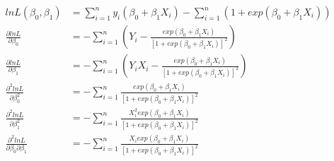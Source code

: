 \documentclass{article}\usepackage[]{graphicx}\usepackage[]{color}
\begin{document}
\begin{displaymath}
\begin{split}
  lnL(\beta_0, \beta_1) &= \sum_{i=1}^n y_i(\beta_0+\beta_1 X_i) - \sum_{i=1}^n(1+exp(\beta_0+\beta_1 X_i))\\
  \frac{\partial lnL}{\partial \beta_0} &= - \sum_{i=1}^n (Y_i-\frac{ exp(\beta_0+\beta_1 X_i)}{[1+exp(\beta_0+\beta_1 X_i)]^2})\\
  \frac{\partial lnL}{\partial \beta_1} &= - \sum_{i=1}^n (Y_i X_i - \frac{ exp(\beta_0+\beta_1 X_i)}{[1+exp(\beta_0+\beta_1 X_i)]^2})\\
  \frac{\partial^2 lnL}{\partial \beta_0^2} &= - \sum_{i=1}^n \frac{exp(\beta_0+\beta_1 X_i)}{[1+exp(\beta_0+\beta_1 X_i)]^2}\\
  \frac{\partial^2 lnL}{\partial \beta_1^2} &= - \sum_{i=1}^n \frac{X_i^2 exp(\beta_0+\beta_1 X_i)}{[1+exp(\beta_0+\beta_1 X_i)]^2}\\
  \frac{\partial^2 lnL}{\partial \beta_0 \partial \beta_1} &= - \sum_{i=1}^n \frac{X_i exp(\beta_0+\beta_1 X_i)}{[1+exp(\beta_0+\beta_1 X_i)]^2}\\
\end{split}
\end{displaymath}
\end{document}
